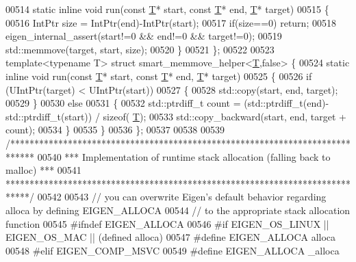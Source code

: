 \begin{DoxyCode}
00514   \textcolor{keyword}{static} \textcolor{keyword}{inline} \textcolor{keywordtype}{void} run(\textcolor{keyword}{const} \hyperlink{group___sparse_core___module_class_eigen_1_1_triplet}{T}* start, \textcolor{keyword}{const} \hyperlink{group___sparse_core___module_class_eigen_1_1_triplet}{T}* end, \hyperlink{group___sparse_core___module_class_eigen_1_1_triplet}{T}* target)
00515   \{
00516     IntPtr size = IntPtr(end)-IntPtr(start);
00517     \textcolor{keywordflow}{if}(size==0) \textcolor{keywordflow}{return};
00518     eigen\_internal\_assert(start!=0 && end!=0 && target!=0);
00519     std::memmove(target, start, size);
00520   \}
00521 \};
00522 
00523 \textcolor{keyword}{template}<\textcolor{keyword}{typename} T> \textcolor{keyword}{struct }smart\_memmove\_helper<\hyperlink{group___sparse_core___module_class_eigen_1_1_triplet}{T},false> \{
00524   \textcolor{keyword}{static} \textcolor{keyword}{inline} \textcolor{keywordtype}{void} run(\textcolor{keyword}{const} \hyperlink{group___sparse_core___module_class_eigen_1_1_triplet}{T}* start, \textcolor{keyword}{const} \hyperlink{group___sparse_core___module_class_eigen_1_1_triplet}{T}* end, \hyperlink{group___sparse_core___module_class_eigen_1_1_triplet}{T}* target)
00525   \{ 
00526     \textcolor{keywordflow}{if} (UIntPtr(target) < UIntPtr(start))
00527     \{
00528       std::copy(start, end, target);
00529     \}
00530     \textcolor{keywordflow}{else}                                 
00531     \{
00532       std::ptrdiff\_t count = (std::ptrdiff\_t(end)-std::ptrdiff\_t(start)) / \textcolor{keyword}{sizeof}(
      \hyperlink{group___sparse_core___module_class_eigen_1_1_triplet}{T});
00533       std::copy\_backward(start, end, target + count); 
00534     \}
00535   \}
00536 \};
00537 
00538 
00539 \textcolor{comment}{/*****************************************************************************}
00540 \textcolor{comment}{*** Implementation of runtime stack allocation (falling back to malloc)    ***}
00541 \textcolor{comment}{*****************************************************************************/}
00542 
00543 \textcolor{comment}{// you can overwrite Eigen's default behavior regarding alloca by defining EIGEN\_ALLOCA}
00544 \textcolor{comment}{// to the appropriate stack allocation function}
00545 \textcolor{preprocessor}{#ifndef EIGEN\_ALLOCA}
00546 \textcolor{preprocessor}{  #if EIGEN\_OS\_LINUX || EIGEN\_OS\_MAC || (defined alloca)}
00547 \textcolor{preprocessor}{    #define EIGEN\_ALLOCA alloca}
00548 \textcolor{preprocessor}{  #elif EIGEN\_COMP\_MSVC}
00549 \textcolor{preprocessor}{    #define EIGEN\_ALLOCA \_alloca}

\end{DoxyCode}
